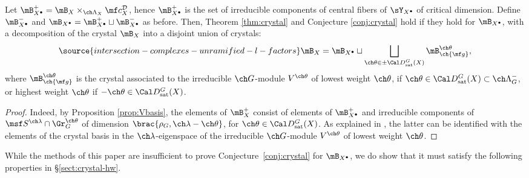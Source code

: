 \begin{lem}
\notready\label{lem:reduction-Xbullet}
 Let $\mB_{X^\bullet}^+ = \mB_X \times_{\ch\Lambda_X} \mf c_X^{\mathcal D}$, hence $\mB_{X^\bullet}^+$ is the set of irreducible components of central fibers of $\sY_{X^\bullet}$ of critical dimension. Define $\mB_{X^\bullet}^-$ and $\mB_{X^\bullet} = \mB_{X^\bullet}^+ \sqcup \mB_{X^\bullet}^-$ as before. Then, Theorem \ref{thm:crystal} and Conjecture \ref{conj:crystal} hold if they hold for $\mB_{X^\bullet}$, with a decomposition of the crystal $\mB_X$ into a disjoint union of crystals:
\begin{equation}
\label{eq:crystaldecomp}
\source{intersection-complexes-unramified-l-factors}
\mB_X =  \mB_{X^\bullet} \sqcup \bigsqcup_{\ch\theta \in \pm \Cal D^G_{\mathrm{sat}}(X)} \mB^{\ch\theta}_{\ch{\mf g}},
\end{equation}
where $\mB^{\ch\theta}_{\ch{\mf g}}$ is the crystal
associated to the irreducible
$\ch G$-module $V^{\ch\theta}$ of lowest weight $\ch\theta$, if $\ch\theta \in \Cal D^G_{\mathrm{sat}}(X) \subset \ch\Lambda_G^-$, or highest weight $\ch\theta$ if $-\ch\theta \in \Cal D^G_{\mathrm{sat}}(X)$.
\end{lem}

\begin{proof}
 Indeed, by Proposition \ref{prop:Vbasis}, the elements of $\mB_X^+$ consist of elements of $\mB_{X^\bullet}^+$ and irreducible components of $\msf S^{\ch\lambda} \cap \Gr_G^{\ch\theta}$
of dimension $\brac{\rho_G,\ch\lambda-\ch\theta}$, for $\ch\theta \in \Cal D^G_{\mathrm{sat}}(X)$.
As explained in \cite{BGcrys}, the latter can be identified with the elements of
the crystal basis in the $\ch\lambda$-eigenspace of the irreducible $\ch G$-module $V^{\ch\theta}$ of lowest weight $\ch\theta$.
\end{proof}

While the methods of this paper are insufficient to prove Conjecture~\ref{conj:crystal}
for $\mB_{X^\bullet}$, we do show that it must satisfy the following properties
in \S\ref{sect:crystal-hw}.


